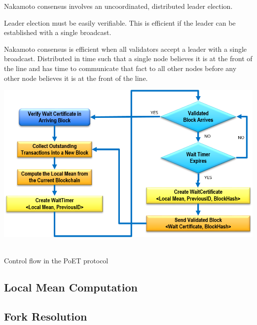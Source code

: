 Nakamoto consensus involves an uncoordinated, distributed leader election.

Leader election must be easily verifiable.
This is efficient if the leader can be established with a single broadcast. 

Nakamoto consensus is efficient when all validators accept a leader with a single broadcast.
Distributed in time such that a single node believes it is at the front of the line and has time to communicate that
fact to all other nodes before any other node believes it is at the front of the line.

\begin{center}
  \includegraphics[scale=.75]{figures/PoET_Flow.png} \
  \caption{Control flow in the PoET protocol}
  \label{fig:poetflow}
\end{center}

\subsection{Local Mean Computation}

\subsection{Fork Resolution}

